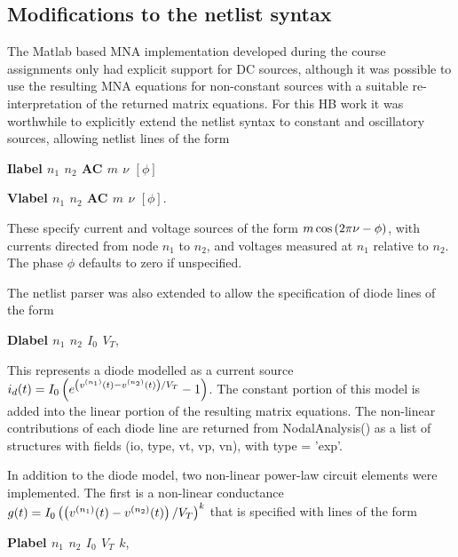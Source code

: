 \subsection{Modifications to the netlist syntax}

The Matlab based MNA implementation developed during the course assignments only had explicit support for DC sources, although it was possible to use the resulting MNA equations for non-constant sources with a suitable re-interpretation of the returned matrix equations.  For this HB work it was worthwhile to explicitly extend the netlist syntax to constant and oscillatory sources, allowing netlist lines of the form  

\begin{center}
\textbf{Ilabel \(n_1\) \(n_2\) AC \(m\) \(\nu\) \([\phi]\)}
\end{center}
\begin{center}
\textbf{Vlabel \(n_1\) \(n_2\) AC \(m\) \(\nu\) \([\phi]\)}.
\end{center}

These specify current and voltage sources of the form \( m \cos\left( 2 \pi \nu - \phi \right) \), with currents directed from node \( n_1 \) to \( n_2 \), and voltages measured at \( n_1 \) relative to \( n_2 \).
The phase \( \phi \) defaults to zero if unspecified.

The netlist parser was also extended to allow the specification of diode lines of the form

\begin{center}
\textbf{Dlabel \(n_1\) \(n_2\) \(I_0\) \(V_T\)},
\end{center}

This represents a diode modelled as a current source \( i_d(t) = I_0 \left( e^{ \left(v^{(n_1)}(t) - v^{(n_2)}(t)\right)/V_T } - 1 \right) \).  The constant portion of this model is added into the linear portion of the resulting matrix equations.  The non-linear contributions of each diode line are returned from NodalAnalysis() as a list of structures with fields (io, type, vt, vp, vn), with type = 'exp'.

In addition to the diode model, two non-linear power-law circuit elements were implemented.  The first is a non-linear conductance \( g(t) = I_0 \left( \left(v^{(n_1)}(t) - v^{(n_2)}(t)\right)/V_T\right)^k \) that is specified with lines of the form

\begin{center}
\textbf{Plabel \(n_1\) \(n_2\) \(I_0\) \(V_T\) \( k \)},
\end{center}

